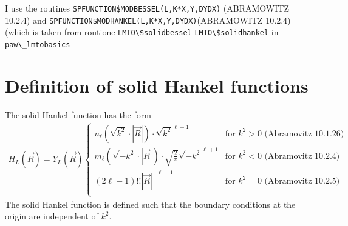 \documentclass[11pt,a4paper]{report}
\begin{document}






I use the routines \verb|SPFUNCTION$MODBESSEL(L,K*X,Y,DYDX)| (ABRAMOWITZ 10.2.4)
and \verb|SPFUNCTION$MODHANKEL(L,K*X,Y,DYDX)|(ABRAMOWITZ 10.2.4)
(which is taken from routione \verb|LMTO\$solidbessel| 
\verb|LMTO\$solidhankel| in \verb|paw\_lmtobasics|




\appendix
\chapter{Definition of solid Hankel functions}
\label{app:solidhankel}
The solid Hankel function has the form
\begin{eqnarray}
H_L(\vec{R})=Y_L(\vec{R})
\begin{cases}
n_\ell(\sqrt{k^2}\cdot|\vec{R}|) \cdot \sqrt{k^2}^{\ell+1}
&\text{for $k^2>0$  (Abramovitz 10.1.26)}\\
m_\ell(\sqrt{-k^2}\cdot|\vec{R}|) \cdot \sqrt{\frac{2}{\pi}} \sqrt{-k^2}^{\ell+1}
&\text{for $k^2<0$  (Abramovitz 10.2.4)}\\
(2\ell-1)!! |\vec{R}|^{-\ell-1} 
&\text{for $k^2=0$  (Abramovitz 10.2.5)}\\
\end{cases}
\end{eqnarray}
The solid Hankel function is defined such that the boundary conditions
at the origin are independent of $k^2$.
\end{document}

